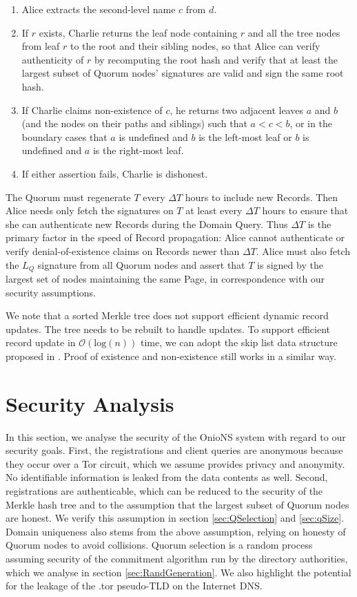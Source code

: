 \documentclass[conference]{IEEEtran}
\begin{document}
\begin{enumerate}
	\item Alice extracts the second-level name $ c $ from $ d $.
	\item If $ r $ exists, Charlie returns the leaf node containing $ r $ and all the tree nodes from leaf $ r $ to the root and their sibling nodes, so that Alice can verify authenticity of $ r $ by recomputing the root hash and verify that at least the largest subset of Quorum nodes' signatures are valid and sign the same root hash.	
	\item If Charlie claims non-existence of $ c $, he returns two adjacent leaves $ a $ and $ b $ (and the nodes on their paths and siblings) such that $ a < c < b $, or in the boundary cases that $ a $ is undefined and $ b $ is the left-most leaf or $ b $ is undefined and $ a $ is the right-most leaf.
	\item If either assertion fails, Charlie is dishonest.
\end{enumerate}

The Quorum must regenerate $ T $ every $ \Delta T $ hours to include new Records. Then Alice needs only fetch the signatures on $ T $ at least every $ \Delta T $ hours to ensure that she can authenticate new Records during the Domain Query. Thus $ \Delta T $ is the primary factor in the speed of Record propagation: Alice cannot authenticate or verify denial-of-existence claims on Records newer than $ \Delta T $. Alice must also fetch the $ L_{Q} $ signature from all Quorum nodes and assert that $ T $ is signed by the largest set of nodes maintaining the same Page, in correspondence with our security assumptions.

We note that a sorted Merkle tree does not support efficient dynamic record updates. The tree needs to be rebuilt to handle updates. To support efficient record update in $ \mathcal{O}(\mathrm{log}(n)) $ time, we can adopt the skip list data structure proposed in  \cite{goodrich2001implementation}. Proof of existence and non-existence still works in a similar way.

\section{Security Analysis}
\label{sec:Analysis}

In this section, we analyse the security of the OnioNS system with regard to our security goals. First, the registrations and client queries are anonymous because they occur over a Tor circuit, which we assume provides privacy and anonymity. No identifiable information is leaked from the data contents as well. Second, registrations are authenticable, which can be reduced to the security of the Merkle hash tree and to the assumption that the largest subset of Quorum nodes are honest. We verify this assumption in section \ref{sec:QSelection} and \ref{sec:qSize}. Domain uniqueness also stems from the above assumption, relying on honesty of Quorum nodes to avoid collisions. Quorum selection is a random process assuming security of the commitment algorithm run by the directory authorities, which we analyse in section \ref{sec:RandGeneration}. We also highlight the potential for the leakage of the .tor pseudo-TLD on the Internet DNS.
\end{document}
